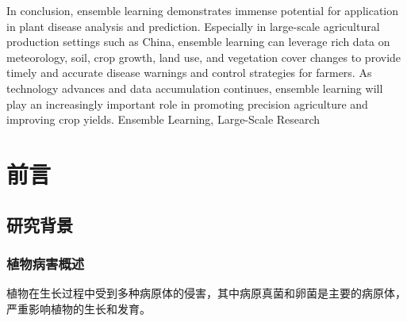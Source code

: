 \documentclass[AutoFakeBold]{LZUThesis-PgD&PhD}
\begin{document}
{In conclusion, ensemble learning demonstrates immense potential for application in plant disease analysis and prediction. Especially in large-scale agricultural production settings such as China, ensemble learning can leverage rich data on meteorology, soil, crop growth, land use, and vegetation cover changes to provide timely and accurate disease warnings and control strategies for farmers. As technology advances and data accumulation continues, ensemble learning will play an increasingly important role in promoting precision agriculture and improving crop yields.    %
}{Ensemble Learning, Large-Scale Research}

\tableofcontents


\mainmatter

\chapter{前言}

\section{研究背景}



\subsection{植物病害概述}

植物在生长过程中受到多种病原体的侵害，其中病原真菌和卵菌是主要的病原体，严重影响植物的生长和发育。
\end{document}
